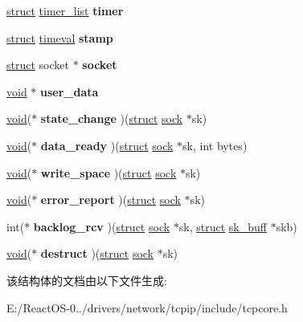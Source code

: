 \begin{DoxyCompactItemize}
\begin{tabbing}
\end{tabbing}\item 
\mbox{\label{structsock_a4a5a46f797ec73b5e8eb9c59ca7d71be}} 
\hyperlink{interfacestruct}{struct} \hyperlink{structtimer__list}{timer\+\_\+list} {\bfseries timer}
\item 
\mbox{\label{structsock_a52aa7bba02af37834a1ff9c8cf2140dd}} 
\hyperlink{interfacestruct}{struct} \hyperlink{structtimeval}{timeval} {\bfseries stamp}
\item 
\mbox{\label{structsock_a9e04d8d0e9bfedf031ad92a53b766655}} 
\hyperlink{interfacestruct}{struct} socket $\ast$ {\bfseries socket}
\item 
\mbox{\label{structsock_a31a11c5fe5c8164c85ab54c49ea87bc1}} 
\hyperlink{interfacevoid}{void} $\ast$ {\bfseries user\+\_\+data}
\item 
\mbox{\label{structsock_a30c722e1f9a753b8895fd847e53d90b4}} 
\hyperlink{interfacevoid}{void}($\ast$ {\bfseries state\+\_\+change} )(\hyperlink{interfacestruct}{struct} \hyperlink{structsock}{sock} $\ast$sk)
\item 
\mbox{\label{structsock_a444f3a1356006329a0e3913b36df9a45}} 
\hyperlink{interfacevoid}{void}($\ast$ {\bfseries data\+\_\+ready} )(\hyperlink{interfacestruct}{struct} \hyperlink{structsock}{sock} $\ast$sk, int bytes)
\item 
\mbox{\label{structsock_acc4a446bac6fe51cbef14f6e760a43f8}} 
\hyperlink{interfacevoid}{void}($\ast$ {\bfseries write\+\_\+space} )(\hyperlink{interfacestruct}{struct} \hyperlink{structsock}{sock} $\ast$sk)
\item 
\mbox{\label{structsock_a77d2e1db423802d0fafae8be0d93d71d}} 
\hyperlink{interfacevoid}{void}($\ast$ {\bfseries error\+\_\+report} )(\hyperlink{interfacestruct}{struct} \hyperlink{structsock}{sock} $\ast$sk)
\item 
\mbox{\label{structsock_a6a839d04e6ae9862f27872ef1628f059}} 
int($\ast$ {\bfseries backlog\+\_\+rcv} )(\hyperlink{interfacestruct}{struct} \hyperlink{structsock}{sock} $\ast$sk, \hyperlink{interfacestruct}{struct} \hyperlink{structsk__buff}{sk\+\_\+buff} $\ast$skb)
\item 
\mbox{\label{structsock_a279eaaacf3f91bdefa48d203561f7db0}} 
\hyperlink{interfacevoid}{void}($\ast$ {\bfseries destruct} )(\hyperlink{interfacestruct}{struct} \hyperlink{structsock}{sock} $\ast$sk)
\end{DoxyCompactItemize}


该结构体的文档由以下文件生成\+:\begin{DoxyCompactItemize}
\item 
E\+:/\+React\+O\+S-\/0../drivers/network/tcpip/include/tcpcore.\+h\end{DoxyCompactItemize}
